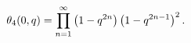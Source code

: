 \[\mathop{\theta_{4}\/}\nolimits\!\left(0,q\right)=\prod\limits_{n=1}^{\infty}%
\left(1-q^{2n}\right)\left(1-q^{2n-1}\right)^{2}.\]